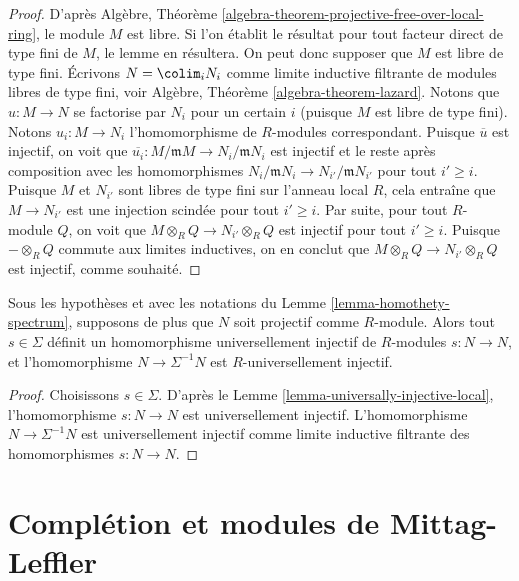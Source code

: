 \begin{proof}
D'après
Algèbre, Théorème \ref{algebra-theorem-projective-free-over-local-ring},
le module $M$ est libre. Si l'on établit le résultat pour tout facteur direct de type
fini de $M$, le lemme en résultera. On peut donc
supposer que $M$ est libre de type fini. Écrivons $N = \colim_i N_i$ comme
limite inductive filtrante de modules libres de type fini, voir
Algèbre, Théorème \ref{algebra-theorem-lazard}.
Notons que $u : M \to N$ se factorise par $N_i$ pour un certain $i$ (puisque $M$ est libre
de type fini). Notons $u_i : M \to N_i$ l'homomorphisme de $R$-modules correspondant.
Puisque $\overline{u}$ est injectif, on voit que
$\overline{u_i} : M/\mathfrak mM \to N_i/\mathfrak mN_i$ est
injectif et le reste après composition avec les homomorphismes
$N_i/\mathfrak mN_i \to N_{i'}/\mathfrak mN_{i'}$ pour tout $i' \geq i$.
Puisque $M$ et $N_{i'}$ sont libres de type fini sur l'anneau local $R$, cela entraîne
que $M \to N_{i'}$ est une injection scindée pour tout $i' \geq i$. Par suite,
pour tout $R$-module $Q$, on voit que $M \otimes_R Q \to N_{i'} \otimes_R Q$
est injectif pour tout $i' \geq i$. Puisque $- \otimes_R Q$ commute aux
limites inductives, on en conclut que $M \otimes_R Q \to N_{i'} \otimes_R Q$
est injectif, comme souhaité.
\end{proof}

\begin{lemma}
\label{lemma-invert-universally-injective}
Sous les hypothèses et avec les notations du
Lemme \ref{lemma-homothety-spectrum},
supposons de plus que $N$ soit projectif comme $R$-module.
Alors tout $s \in \Sigma$ définit un
homomorphisme universellement injectif de $R$-modules $s : N \to N$, et
l'homomorphisme $N \to \Sigma^{-1}N$ est $R$-universellement injectif.
\end{lemma}

\begin{proof}
Choisissons $s \in \Sigma$. D'après le
Lemme \ref{lemma-universally-injective-local},
l'homomorphisme $s : N \to N$ est universellement injectif.
L'homomorphisme $N \to \Sigma^{-1}N$ est universellement injectif comme limite
inductive filtrante des homomorphismes $s : N \to N$.
\end{proof}






\section{Complétion et modules de Mittag-Leffler}
\label{section-completion-ML}


